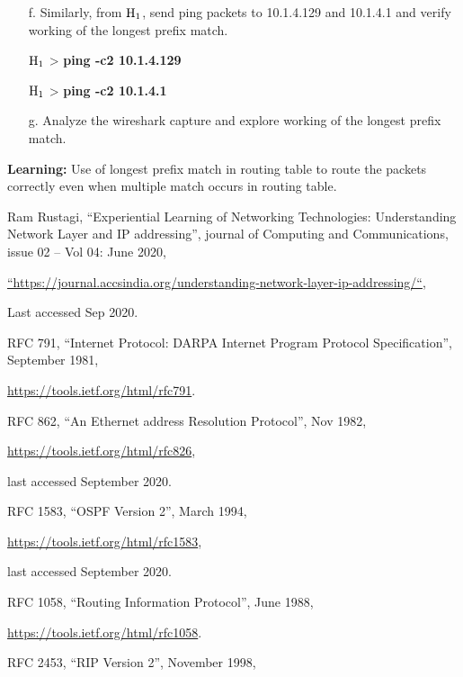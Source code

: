\begin{multicols}{2}
\begin{itemize}
\item[f.] Similarly, from ${\rm H}_{1}$, send ping packets to 10.1.4.129 and 10.1.4.1 and verify working of the longest prefix match.

${\rm H}_{1}$ > \textbf{ping -c2 10.1.4.129}

${\rm H}_{1}$ > \textbf{ping -c2 10.1.4.1}

\item[g.] Analyze the wireshark capture and explore working of the longest prefix match.
\end{itemize}

\textbf{Learning:} Use of longest prefix match in routing table to route the packets correctly even when multiple match occurs in routing table.

\begin{thebibliography}{99}

 Ram Rustagi, “Experiential Learning of Networking Technologies: Understanding Network Layer and IP addressing”, journal of Computing and Communications, issue 02 – Vol 04: June 2020,

\url{“https://journal.accsindia.org/understanding-network-layer-ip-addressing/“},

Last accessed Sep 2020.

 RFC 791, “Internet Protocol: DARPA Internet Program Protocol Specification”, September 1981,

\url{ https://tools.ietf.org/html/rfc791}.

 RFC 862, “An Ethernet address Resolution Protocol”, Nov 1982, 

\url{https://tools.ietf.org/html/rfc826},

last accessed September 2020.

 RFC 1583, “OSPF Version 2”, March 1994,

\url{ https://tools.ietf.org/html/rfc1583},

last accessed September 2020.

 RFC 1058, “Routing Information Protocol”, June 1988,

\url{https://tools.ietf.org/html/rfc1058}.

 RFC 2453, “RIP Version 2”, November 1998, 


\end{thebibliography}
\end{multicols}
